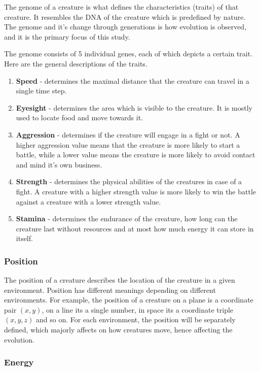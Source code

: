 \documentclass{article}
\begin{document}
The genome of a creature is what defines the characteristics (traits) of that creature. It resembles the DNA of the creature which is predefined by nature. The genome and it's change through generations is how evolution is observed, and it is the primary focus of this study.

The genome consists of 5 individual genes, each of which depicts a certain trait. Here are the general descriptions of the traits.

\begin{enumerate}
    \item \textbf{Speed} - determines the maximal distance that the creature can travel in a single time step.
    \item \textbf{Eyesight} - determines the area which is visible to the creature. It is mostly used to locate food and move towards it.
    \item \textbf{Aggression} - determines if the creature will engage in a fight or not. A higher aggression value means that the creature is more likely to start a battle, while a lower value means the creature is more likely to avoid contact and mind it's own business.
    \item \textbf{Strength} - determines the physical abilities of the creatures in case of a fight. A creature with a higher strength value is more likely to win the battle against a creature with a lower strength value.
    \item \textbf{Stamina} - determines the endurance of the creature, how long can the creature last without resources and at most how much energy it can store in itself. 
\end{enumerate}

\subsubsection{Position}

The position of a creature describes the location of the creature in a given environment. Position has different meanings depending on different environments. For example, the position of a creature on a plane is a coordinate pair $(x, y)$, on a line its a single number, in space its a coordinate triple $(x, y, z)$ and so on. For each environment, the position will be separately defined, which majorly affects on how creatures move, hence affecting the evolution.

\subsubsection{Energy}
\end{document}

